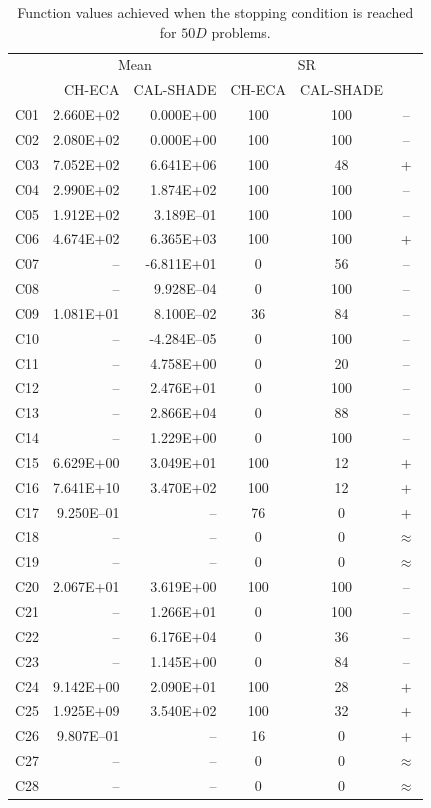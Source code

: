 \documentclass[conference]{IEEEtran}
\begin{document}
% 
% 
% 
\begin{table}[!ht]
	\caption{Function values achieved when the stopping condition is reached for $50D$ problems.}
	\centering
	\begin{tabular}{|c|r|r|c|c|c|}
	 \hline
	 &\multicolumn{2}{|c|}{Mean} & \multicolumn{2}{|c|}{SR} & \\
	\cline{2-5}
	 & CH-ECA & CAL-SHADE & CH-ECA & CAL-SHADE & \\ \hline

C01 & 2.660E+02 & 0.000E+00 &  100 &  100 & -- \\ 
C02 & 2.080E+02 & 0.000E+00 &  100 &  100 & -- \\ 
C03 & 7.052E+02 & 6.641E+06 &  100 &   48 & + \\ 
C04 & 2.990E+02 & 1.874E+02 &  100 &  100 & -- \\ 
C05 & 1.912E+02 & 3.189E--01 &  100 &  100 & -- \\ 
C06 & 4.674E+02 & 6.365E+03 &  100 &  100 & + \\ 
C07 &  -- & -6.811E+01 &    0 &   56 & -- \\ 
C08 &  -- & 9.928E--04 &    0 &  100 & -- \\ 
C09 & 1.081E+01 & 8.100E--02 &   36 &   84 & -- \\ 
C10 &  -- & -4.284E--05 &    0 &  100 & -- \\ 
C11 &  -- & 4.758E+00 &    0 &   20 & -- \\ 
C12 &  -- & 2.476E+01 &    0 &  100 & -- \\ 
C13 &  -- & 2.866E+04 &    0 &   88 & -- \\ 
C14 &  -- & 1.229E+00 &    0 &  100 & -- \\ 
C15 & 6.629E+00 & 3.049E+01 &  100 &   12 & + \\ 
C16 & 7.641E+10 & 3.470E+02 &  100 &   12 & + \\ 
C17 & 9.250E--01 &  -- &   76 &    0 & + \\ 
C18 &  -- &  -- &    0 &    0 & $\approx$ \\ 
C19 &  -- &  -- &    0 &    0 & $\approx$ \\ 
C20 & 2.067E+01 & 3.619E+00 &  100 &  100 & -- \\ 
C21 &  -- & 1.266E+01 &    0 &  100 & -- \\ 
C22 &  -- & 6.176E+04 &    0 &   36 & -- \\ 
C23 &  -- & 1.145E+00 &    0 &   84 & -- \\ 
C24 & 9.142E+00 & 2.090E+01 &  100 &   28 & + \\ 
C25 & 1.925E+09 & 3.540E+02 &  100 &   32 & + \\ 
C26 & 9.807E--01 &  -- &   16 &    0 & + \\ 
C27 &  -- &  -- &    0 &    0 & $\approx$ \\ 
C28 &  -- &  -- &    0 &    0 & $\approx$ \\ 
   \hline
	\end{tabular}
	\label{tab:d50c}
\end{table}
\end{document}
